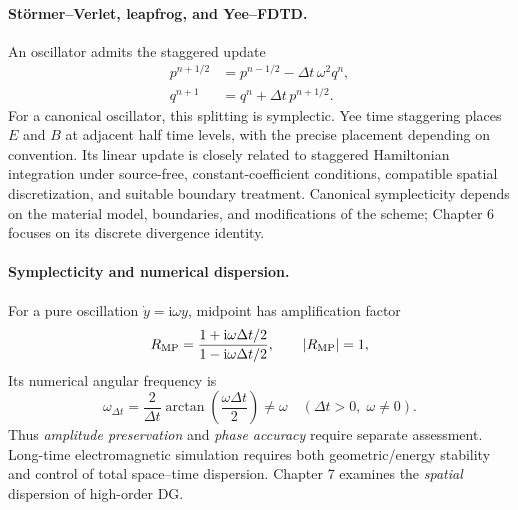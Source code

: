 \documentclass[11pt,openany]{book}
\numberwithin{equation}{chapter}
\theoremstyle{definition}
\theoremstyle{remark}
\begin{document}
\paragraph{St\"ormer--Verlet, leapfrog, and Yee--FDTD.}
An oscillator admits the staggered update
\begin{align}\label{eq:leapfrogosc}
p^{n+1/2}&=p^{n-1/2}-\Delta t\,\omega^2q^n,\\
q^{n+1}&=q^n+\Delta t\,p^{n+1/2}.
\end{align}
For a canonical oscillator, this splitting is symplectic.
Yee time staggering places $E$ and $B$ at adjacent half time levels, with the precise placement depending on convention.
Its linear update is closely related to staggered Hamiltonian integration under source-free, constant-coefficient conditions, compatible spatial discretization, and suitable boundary treatment.
Canonical symplecticity depends on the material model, boundaries, and modifications of the scheme; Chapter 6 focuses on its discrete divergence identity.

\paragraph{Symplecticity and numerical dispersion.}
For a pure oscillation $\dot y=\mathrm i\omega y$, midpoint has amplification factor
\begin{equation}
R_{\rm MP}=\frac{1+\mathrm i\omega\Delta t/2}{1-\mathrm i\omega\Delta t/2},
\qquad |R_{\rm MP}|=1,
\end{equation}
Its numerical angular frequency is
\begin{equation}\label{eq:midpointdisp}
\omega_{\Delta t}=\frac2{\Delta t}
\arctan\!\left(\frac{\omega\Delta t}{2}\right)
\ne\omega\quad(\Delta t>0,\;\omega\ne0).
\end{equation}
Thus \emph{amplitude preservation} and \emph{phase accuracy} require separate assessment.
Long-time electromagnetic simulation requires both geometric/energy stability and control of total space--time dispersion.
Chapter 7 examines the \emph{spatial} dispersion of high-order DG.
\end{document}
